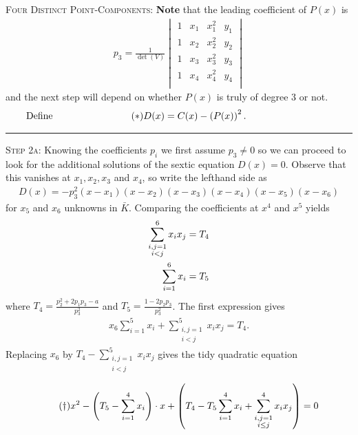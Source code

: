 \documentclass[english,11pt,a4paper]{article}
\begin{document}
\begin{case} {\scshape Four Distinct Point-Components:}
  \textbf{Note} that the leading coefficient of $P(x)$ is
  \begin{align*}
    p_3 = \frac{1}{\det (V)}
    \begin{vmatrix}
      1 & x_1 & x_1^2 & y_1\\
      1 & x_2 & x_2^2 & y_2\\
      1 & x_3 & x_3^2 & y_3\\
      1 & x_4 & x_4^2 & y_4\\   
    \end{vmatrix}
  \end{align*}
  and the next step will depend on whether $P(x)$ is truly of degree 3 or not.\vspace{-1mm}
\fline
\vspace{-2.5mm}
  \begin{align*}\tag{$\ast$} \label{sex}
    \rlap{\hspace{-44.1mm} Define}
    D(x) = C(x)-\left ( P(x) \right )^2.
  \end{align*}\vspace{-5mm}
  \hrule

  {\scshape Step 2a:} Knowing the coefficients $p_i$ we first assume $p_3 \neq 0$ so we can proceed to look for the additional solutions of the sextic equation $D(x) = 0$.
  Observe that this vanishes at $x_1, x_2, x_3$ and $x_4$, so write the lefthand side as
  \begin{align}\tag{$*_1$}
    D(x) = -p_3^2(x-x_1)(x-x_2)(x-x_3)(x-x_4)(x-x_5)(x-x_6)
  \end{align}
   for $x_5$ and $x_6$ unknowns in $\bar K$. Comparing the coefficients at $x^4$ and $x^5$ yields
  \begin{align*}
    \sum_{\substack{i,j=1\\i<j}}^6 x_i x_j &= T_4\\
    \rlap{\hspace{-56mm}and} \sum_{i=1}^6 x_i &= T_5
  \end{align*}
  where $T_4 = \frac{p_2^2+2 p_1 p_3-a}{p_3^2}$ and $T_5 = \frac{1-2 p_2 p_3}{p_3^2}$.
  The first expression gives
  \begin{align*}
    x_6 \sum_{i=1}^5 x_i + \sum_{\substack{i,j=1\\i<j}}^5 x_i x_j = T_4.
  \end{align*}
  Replacing $x_6$ by $T_4 - \sum_{\substack{i,j=1\\i<j}}^5 x_i x_j$ gives the tidy quadratic equation

  \vspace{-2mm}
  \fline
  \begin{align*}
    \tag{$\dag$} \label{dagger} x^2 - \left(T_5 - \sum_{i=1}^4 x_i \right) \cdot x+ \left(T_4 - T_5 \sum_{i=1}^4 x_i + \sum_{\substack{i,j=1\\i\leq j}}^4 x_i x_j \right) = 0
  \end{align*}
  \fline


\end{case}
\end{document}
